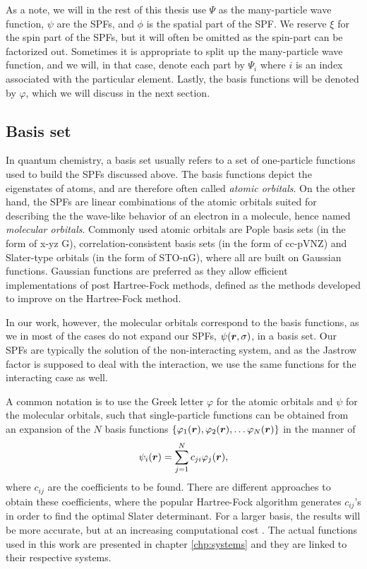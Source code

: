 As a note, we will in the rest of this thesis use $\Psi$ as the many-particle wave function, $\psi$ are the SPFs, and $\phi$ is the spatial part of the SPF. We reserve $\xi$ for the spin part of the SPFs, but it will often be omitted as the spin-part can be factorized out. Sometimes it is appropriate to split up the many-particle wave function, and we will, in that case, denote each part by $\Psi_i$ where $i$ is an index associated with the particular element. Lastly, the basis functions will be denoted by $\varphi$, which we will discuss in the next section.

\subsection{Basis set} \label{sec:basisset}
In quantum chemistry, a basis set usually refers to a set of one-particle functions used to build the SPFs discussed above. The basis functions depict the eigenstates of atoms, and are therefore often called \textit{atomic orbitals}. On the other hand, the SPFs are linear combinations of the atomic orbitals suited for describing the the wave-like behavior of an electron in a molecule, hence named \textit{molecular orbitals}. Commonly used atomic orbitals are Pople basis sets \supercite{ditchfield_self-consistent_1971} (in the form of x-yz G), correlation-consistent basis sets \supercite{dunning_gaussian_1989} (in the form of cc-pVNZ) and Slater-type orbitals \supercite{slater_atomic_1930} (in the form of STO-nG), where all are built on Gaussian functions. Gaussian functions are preferred as they allow efficient implementations of post Hartree-Fock methods, defined as the methods developed to improve on the Hartree-Fock method.

In our work, however, the molecular orbitals correspond to the basis functions, as we in most of the cases do not expand our SPFs, $\psi(\boldsymbol{{r}},\sigma)$, in a basis set. Our SPFs are typically the solution of the non-interacting system, and as the Jastrow factor is supposed to deal with the interaction, we use the same functions for the interacting case as well.

A common notation is to use the Greek letter $\varphi$ for the atomic orbitals and $\psi$ for the molecular orbitals, such that single-particle functions can be obtained from an expansion of the $N$ basis functions $\{\varphi_1(\boldsymbol{{r}}),\varphi_2(\boldsymbol{{r}}),\hdots\varphi_N(\boldsymbol{{r}})\}$ in the manner of
\begin{equation}
\psi_i(\boldsymbol{{r}})=\sum_{j=1}^Nc_{ji}\varphi_j(\boldsymbol{{r}}),
\label{eq:expansion}
\end{equation}
where $c_{ij}$ are the coefficients to be found. There are different approaches to obtain these coefficients, where the popular Hartree-Fock algorithm generates $c_{ij}$'s in order to find the optimal Slater determinant. For a larger basis, the results will be more accurate, but at an increasing computational cost \supercite{daniel_crawford_introduction_2007}. The actual functions used in this work are presented in chapter \ref{chp:systems} and they are linked to their respective systems. 


